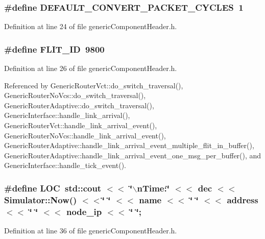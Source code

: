 \subsubsection[{DEFAULT\_\-CONVERT\_\-PACKET\_\-CYCLES}]{\setlength{\rightskip}{0pt plus 5cm}\#define DEFAULT\_\-CONVERT\_\-PACKET\_\-CYCLES~1}\label{genericComponentHeader_8h_4cd25c48b8874affbec9785d9d4ba055}




Definition at line 24 of file genericComponentHeader.h.
\subsubsection[{FLIT\_\-ID}]{\setlength{\rightskip}{0pt plus 5cm}\#define FLIT\_\-ID~9800}\label{genericComponentHeader_8h_4c17fe87d84664c123df538e6be7fa5c}




Definition at line 26 of file genericComponentHeader.h.

Referenced by GenericRouterVct::do\_\-switch\_\-traversal(), GenericRouterNoVcs::do\_\-switch\_\-traversal(), GenericRouterAdaptive::do\_\-switch\_\-traversal(), GenericInterface::handle\_\-link\_\-arrival(), GenericRouterVct::handle\_\-link\_\-arrival\_\-event(), GenericRouterNoVcs::handle\_\-link\_\-arrival\_\-event(), GenericRouterAdaptive::handle\_\-link\_\-arrival\_\-event\_\-multiple\_\-flit\_\-in\_\-buffer(), GenericRouterAdaptive::handle\_\-link\_\-arrival\_\-event\_\-one\_\-msg\_\-per\_\-buffer(), and GenericInterface::handle\_\-tick\_\-event().
\subsubsection[{LOC}]{\setlength{\rightskip}{0pt plus 5cm}\#define LOC~std::cout $<$$<$ \char`\"{}$\backslash$nTime:\char`\"{} $<$$<$ dec $<$$<$ Simulator::Now() $<$$<$\char`\"{} \char`\"{} $<$$<$ name $<$$<$ \char`\"{} \char`\"{} $<$$<$ address $<$$<$ \char`\"{} \char`\"{} $<$$<$ node\_\-ip $<$$<$ \char`\"{} \char`\"{};}\label{genericComponentHeader_8h_0fee446a4a4ef6536664bc1ff47ff694}




Definition at line 36 of file genericComponentHeader.h.
